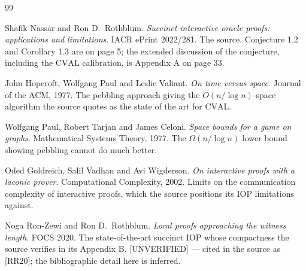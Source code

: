 \documentclass{aicr-conjecture}
\newcommand{\Om}{\Omega}
\begin{document}
\begin{aicrbibliography}{99}

Shafik Nassar and Ron D.\ Rothblum.
\emph{Succinct interactive oracle proofs: applications and limitations}.
IACR ePrint 2022/281.
The source. Conjecture 1.2 and Corollary 1.3 are on page 5; the extended
discussion of the conjecture, including the $\mathrm{CVAL}$ calibration,
is Appendix A on page 33.

John Hopcroft, Wolfgang Paul and Leslie Valiant.
\emph{On time versus space}.
Journal of the ACM, 1977.
The pebbling approach giving the $O(n/\log n)$-space algorithm the source
quotes as the state of the art for $\mathrm{CVAL}$.

Wolfgang Paul, Robert Tarjan and James Celoni.
\emph{Space bounds for a game on graphs}.
Mathematical Systems Theory, 1977.
The $\Om(n/\log n)$ lower bound showing pebbling cannot do much better.

Oded Goldreich, Salil Vadhan and Avi Wigderson.
\emph{On interactive proofs with a laconic prover}.
Computational Complexity, 2002.
Limits on the communication complexity of interactive proofs, which the
source positions its IOP limitations against.

Noga Ron-Zewi and Ron D.\ Rothblum.
\emph{Local proofs approaching the witness length}.
FOCS 2020.
The state-of-the-art succinct IOP whose compactness the source verifies
in its Appendix B\@. [UNVERIFIED] --- cited in the source as [RR20]; the
bibliographic detail here is inferred.

\end{aicrbibliography}
\end{document}

